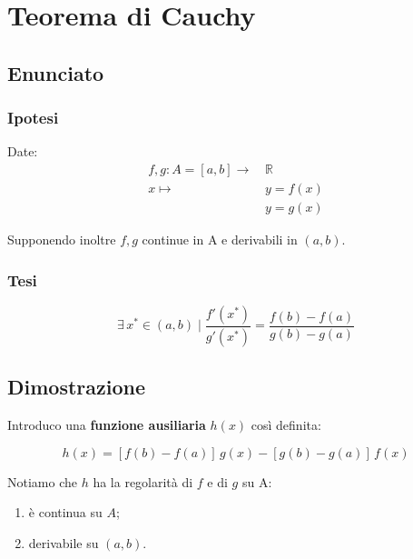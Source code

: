 \documentclass[../../analisi1]{subfiles}
\begin{document}
    \chapter{Teorema di Cauchy}
    \label{teoCauchy}

        \section*{Enunciato}

            \subsection*{Ipotesi}

                Date:
                \begin{align*}
                    f,g : A = [a, b] \longrightarrow \, &\mathbb{R}\\
                    x \longmapsto \, &y = f(x)\\
                                  &y = g(x) 
                \end{align*}

                Supponendo inoltre \(f, g\) continue in A e derivabili in \( (a,b) \).

            \subsection*{Tesi}

                \[ 
                    \exists \, x^* \in (a,b) \mid \frac{ f'(x^*) }{ g'(x^*) } = \frac{ f(b) - f(a) }{ g(b) - g(a) }
                \]

        \section*{Dimostrazione}

            Introduco una \textbf{funzione ausiliaria} \(h(x)\) così definita:

            \[ 
                h(x) = \left[f(b) - f(a)\right] \, g(x) - \left[g(b) - g(a)\right] \, f(x)
            \]

            Notiamo che \(h\) ha la regolarità di \(f\) e di \(g\) su A:
            \begin{enumerate}
                \indentitem \item è continua su \( A \);
                \indentitem \item derivabile su \( (a, b) \).
            \end{enumerate}
\end{document}
